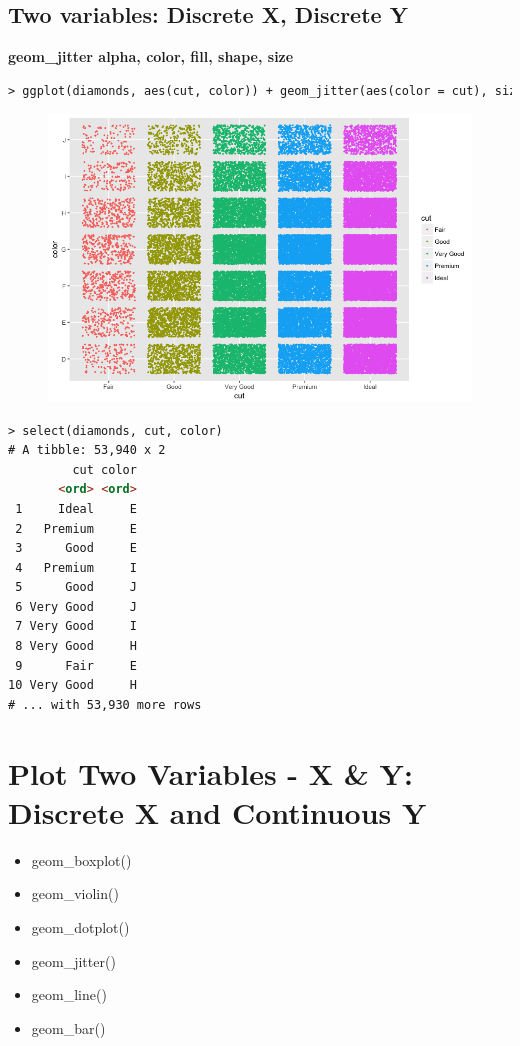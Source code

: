 \subsection{Two variables: Discrete X, Discrete Y}

\textbf{geom_jitter\newline
alpha, color, fill, shape, size}
\begin{lstlisting}[language=html]
> ggplot(diamonds, aes(cut, color)) + geom_jitter(aes(color = cut), size = 0.5)
\end{lstlisting}
\begin{figure}[H]\begin{center}\includegraphics[scale=1 ]{ilu/bg69.png}\end{center}\end{figure}
\begin{lstlisting}[language=html]
> select(diamonds, cut, color)
# A tibble: 53,940 x 2
         cut color
       <ord> <ord>
 1     Ideal     E
 2   Premium     E
 3      Good     E
 4   Premium     I
 5      Good     J
 6 Very Good     J
 7 Very Good     I
 8 Very Good     H
 9      Fair     E
10 Very Good     H
# ... with 53,930 more rows
\end{lstlisting}

\section{Plot Two Variables - X & Y: Discrete X and Continuous Y}
\begin{itemize}
  \item geom\_boxplot()
  \item geom\_violin()
  \item geom\_dotplot()
  \item geom\_jitter()
  \item geom\_line()
  \item geom\_bar()

\end{itemize}

